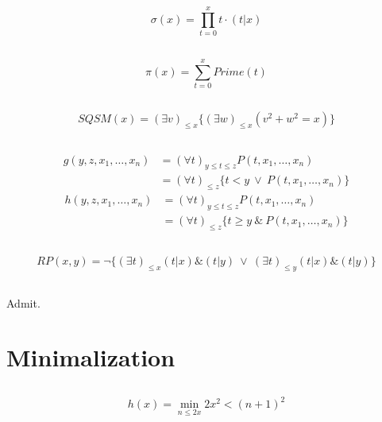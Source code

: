 \subsection{}
\[ \sigma(x) = \prod_{t=0}^{x}{t\cdot(t|x)} \]

\subsection{}
\[ \pi(x) = \sum_{t=0}^{x}{Prime(t)} \]

\subsection{}
\[ SQSM(x) = (\exists v)_{\le x}\{ (\exists w)_{\le x}(v^2+w^2=x) \} \]

\subsection{}
\[ \begin{array}{rl}
    g(y,z,x_{1},\dots ,x_{n}) 
  & = (\forall t)_{y\le t\le z}P(t,x_{1},\dots,x_{n}) \\
  & = (\forall t)_{\le z}\{ t<y \ \lor\ P(t,x_{1},\dots,x_{n}) \}
\end{array}\] \[ \begin{array}{rl}
    h(y,z,x_{1},\dots ,x_{n})
  & = (\forall t)_{y\le t\le z}P(t,x_{1},\dots,x_{n}) \\
  & = (\forall t)_{\le z}\{ t\ge y \ \&\ P(t,x_{1},\dots,x_{n}) \}
\end{array}\]

\subsection{}
\[ RP(x,y) = \neg\{ (\exists t)_{\le x}(t|x)\&(t|y) \ \lor\ 
                    (\exists t)_{\le y}(t|x)\&(t|y)  \} \]

\subsection{}
Admit.



\section{Minimalization}

\subsection{}
\[ h(x) = \min_{n\le 2x}{2x^2<(n+1)^2} \]

